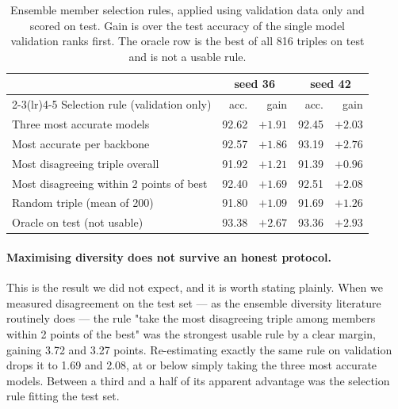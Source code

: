 \documentclass[runningheads]{llncs}
\begin{document}
\begin{table}[tb]
\centering
\caption{Ensemble member selection rules, applied using validation data only
and scored on test. Gain is over the test accuracy of the single model
validation ranks first. The oracle row is the best of all 816 triples on test
and is not a usable rule.}
\label{tab:strategy}
\begin{tabular}{lrrrr}
\toprule
& \multicolumn{2}{c}{seed 36} & \multicolumn{2}{c}{seed 42} \\
\cmidrule(lr){2-3}\cmidrule(lr){4-5}
Selection rule (validation only) & acc. & gain & acc. & gain \\
\midrule
Three most accurate models               & 92.62 & $+1.91$ & 92.45 & $+2.03$ \\
Most accurate per backbone               & 92.57 & $+1.86$ & 93.19 & $+2.76$ \\
Most disagreeing triple overall          & 91.92 & $+1.21$ & 91.39 & $+0.96$ \\
Most disagreeing within 2 points of best & 92.40 & $+1.69$ & 92.51 & $+2.08$ \\
Random triple (mean of 200)              & 91.80 & $+1.09$ & 91.69 & $+1.26$ \\
\midrule
Oracle on test (not usable)              & 93.38 & $+2.67$ & 93.36 & $+2.93$ \\
\bottomrule
\end{tabular}
\end{table}

\paragraph{Maximising diversity does not survive an honest protocol.}
This is the result we did not expect, and it is worth stating plainly. When we
measured disagreement on the test set --- as the ensemble diversity literature
routinely does --- the rule "take the most disagreeing triple among members
within 2 points of the best" was the strongest usable rule by a clear margin,
gaining 3.72 and 3.27 points. Re-estimating exactly the same rule on validation
drops it to 1.69 and 2.08, at or below simply taking the three most accurate
models. Between a third and a half of its apparent advantage was the selection
rule fitting the test set.
\end{document}
